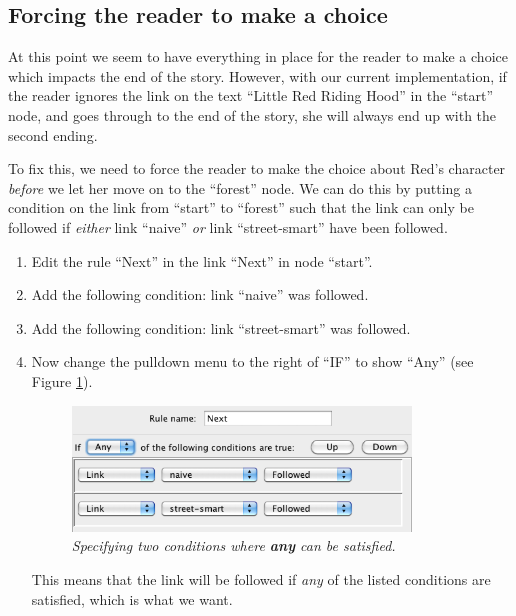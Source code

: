\documentclass{article}
\begin{document}
\subsection{Forcing the reader to make a choice}

At this point we seem to have everything in place for the reader to make a
choice which impacts the end of the story. However, with our current
implementation, if the reader ignores the link on the text ``Little Red Riding
Hood'' in the ``start'' node, and goes through to the end of the story, she will
always end up with the second ending.

To fix this, we need to force the reader to make the choice about Red's character
\textit{before} we let her move on to the ``forest'' node. We can do this by
putting a condition on the link from ``start'' to ``forest'' such that the link
can only be followed if \textit{either} link ``naive'' \textit{or} link
``street-smart'' have been followed.


\begin{enumerate}
  \item Edit the rule ``Next'' in the link ``Next'' in node ``start''.
  \item Add the following condition: link ``naive'' was followed.
  \item Add the following condition: link ``street-smart'' was followed.
  \item Now change the pulldown menu to the right of ``IF'' to show ``Any'' (see
  Figure \ref{fig:tut2:any_condition}).

\begin{figure}[h]
  \centering
  \includegraphics[width=9cm]{images/hypedyn-tutorial-2-figure-7}
  \caption{\textit{Specifying two conditions where \textbf{any} can be
  satisfied.}}
  \label{fig:tut2:any_condition}
\end{figure} 

This means that the link will be followed if \textit{any} of the listed
conditions are satisfied, which is what we want.

\end{enumerate}
\end{document}
